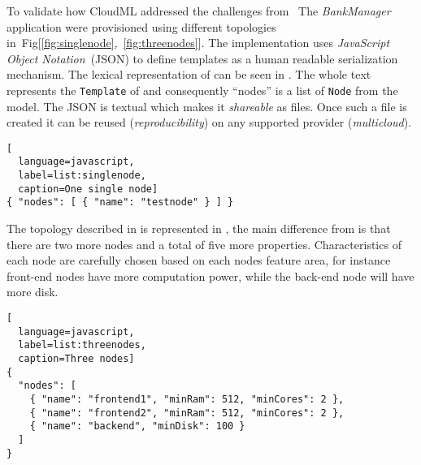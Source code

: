 % 



To validate how CloudML addressed the challenges from~
The \emph{BankManager} application were provisioned using different topologies in~Fig[\ref{fig:singlenode},~\ref{fig:threenodes}].
The implementation uses \emph{JavaScript Object Notation}~(JSON) to define templates
as a human readable serialization mechanism.
The lexical representation of  can be seen in . 
The whole text represents the \texttt{Template} of  and consequently 
``nodes'' is a list of \texttt{Node} from the model.
The JSON is textual which makes it \emph{shareable} as files.
Once such a file is created it can be reused (\emph{reproducibility}) 
on any supported provider (\emph{multicloud}).

\begin{lstlisting}[
  language=javascript,
  label=list:singlenode,
  caption=One single node]
{ "nodes": [ { "name": "testnode" } ] }
\end{lstlisting}

The topology described in  is represented in ,
the main difference from  is that there are two more nodes and a total of 
five more properties.
Characteristics of each node are carefully chosen based on each nodes feature area, for instance 
front-end nodes have more computation power, while the back-end node will have more disk.

\begin{lstlisting}[
  language=javascript,
  label=list:threenodes,
  caption=Three nodes]
{
  "nodes": [ 
    { "name": "frontend1", "minRam": 512, "minCores": 2 },
    { "name": "frontend2", "minRam": 512, "minCores": 2 },
    { "name": "backend", "minDisk": 100 }
  ]
}
\end{lstlisting}
